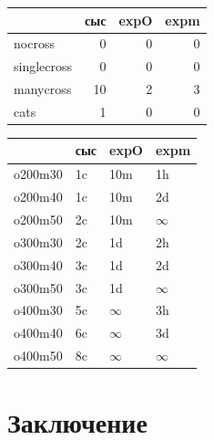 \documentclass{matmex-diploma-custom}
\begin{document}
\begin{tabular}{lrrr}
\hline
 & сыс & expO & expm \\
\hline
nocross & 0 & 0 & 0 \\
singlecross & 0 & 0 & 0 \\
manycross & 10 & 2 & 3 \\
cats & 1 & 0 & 0 \\
\hline
\end{tabular}

\begin{tabular}{llll}
\hline
 & сыс & expO & expm \\
\hline
o200m30 & 1c & 10m & 1h \\
o200m40 & 1c & 10m & 2d \\
o200m50 & 2c & 10m & $\infty$ \\
o300m30 & 2c & 1d & 2h \\
o300m40 & 3c & 1d & 2d \\
o300m50 & 3c & 1d & $\infty$ \\
o400m30 & 5c & $\infty$ & 3h \\
o400m40 & 6c & $\infty$ & 3d \\
o400m50 & 8c & $\infty$ & $\infty$ \\
\hline
\end{tabular}

\section*{Заключение}
\end{document}
